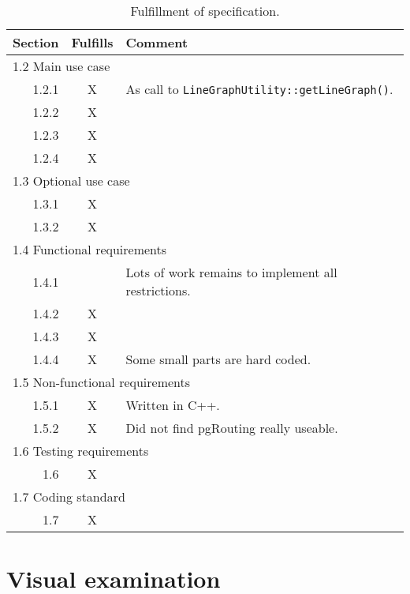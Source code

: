 \documentclass[../main.tex]{subfiles}
\begin{document}
\begin{table}[h]
\centering
\caption{Fulfillment of specification.}
    \begin{tabular}{|r|c||l|}
    \hline
    Section & Fulfills & Comment \\
    \hline
    \hline
    \multicolumn{3}{|l|}{1.2 Main use case} \\
    \hline
    1.2.1 & X & As call to \texttt{LineGraphUtility::getLineGraph()}. \\
    \hline
    1.2.2 & X & \\
    \hline
    1.2.3 & X & \\
    \hline
    1.2.4 & X & \\
    \hline
    \multicolumn{3}{|l|}{1.3 Optional use case} \\
    \hline
    1.3.1 & X & \\
    \hline
    1.3.2 & X & \\
    \hline
    \multicolumn{3}{|l|}{1.4 Functional requirements} \\
    \hline
    1.4.1 & & Lots of work remains to implement all restrictions. \\
    \hline
    1.4.2 & X & \\
    \hline
    1.4.3 & X & \\
    \hline
    1.4.4 & X & Some small parts are hard coded. \\
    \hline
    \multicolumn{3}{|l|}{1.5 Non-functional requirements} \\
    \hline
    1.5.1 & X & Written in C++. \\
    \hline
    1.5.2 & X & Did not find pgRouting really useable. \\
    \hline
    \multicolumn{3}{|l|}{1.6 Testing requirements} \\
    \hline
    1.6 & X &  \\
    \hline
    \multicolumn{3}{|l|}{1.7 Coding standard} \\
    \hline
    1.7 & X & \\
    \hline
    \end{tabular}
\label{table:specification-fulfillment}
\end{table}

\section{Visual examination}\label{sect:result-visual}
\end{document}

